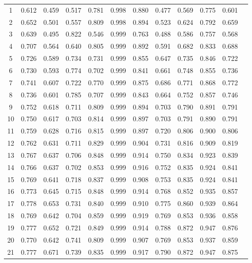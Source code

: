 \begin{longtable}[p]{|c|c|c|c|c|c|c|c|c|c|c|c|}
	
	1 & 0.612 & 0.459 & 0.517 & 0.781 & 0.998 & 0.880 & 0.477 & 0.569 & 0.775 & 0.601 \\
	2 & 0.652 & 0.501 & 0.557 & 0.809 & 0.998 & 0.894 & 0.523 & 0.624 & 0.792 & 0.659 \\
	3 & 0.639 & 0.495 & 0.822 & 0.546 & 0.999 & 0.763 & 0.488 & 0.586 & 0.757 & 0.568 \\
	4 & 0.707 & 0.564 & 0.640 & 0.805 & 0.999 & 0.892 & 0.591 & 0.682 & 0.833 & 0.688 \\
	5 & 0.726 & 0.589 & 0.734 & 0.731 & 0.999 & 0.855 & 0.647 & 0.735 & 0.846 & 0.722 \\
	6 & 0.730 & 0.593 & 0.774 & 0.702 & 0.999 & 0.841 & 0.661 & 0.748 & 0.855 & 0.736 \\
	7 & 0.741 & 0.607 & 0.722 & 0.770 & 0.999 & 0.875 & 0.686 & 0.771 & 0.868 & 0.772 \\
	8 & 0.736 & 0.601 & 0.785 & 0.707 & 0.999 & 0.843 & 0.664 & 0.752 & 0.857 & 0.746 \\
	9 & 0.752 & 0.618 & 0.711 & 0.809 & 0.999 & 0.894 & 0.703 & 0.790 & 0.891 & 0.791 \\
	10 & 0.750 & 0.617 & 0.703 & 0.814 & 0.999 & 0.897 & 0.703 & 0.791 & 0.890 & 0.791 \\
	11 & 0.759 & 0.628 & 0.716 & 0.815 & 0.999 & 0.897 & 0.720 & 0.806 & 0.900 & 0.806 \\
	12 & 0.762 & 0.631 & 0.711 & 0.829 & 0.999 & 0.904 & 0.731 & 0.816 & 0.909 & 0.819 \\
	13 & 0.767 & 0.637 & 0.706 & 0.848 & 0.999 & 0.914 & 0.750 & 0.834 & 0.923 & 0.839 \\
	14 & 0.766 & 0.637 & 0.702 & 0.853 & 0.999 & 0.916 & 0.752 & 0.835 & 0.924 & 0.841 \\
	15 & 0.769 & 0.641 & 0.718 & 0.837 & 0.999 & 0.908 & 0.753 & 0.835 & 0.924 & 0.841 \\
	16 & 0.773 & 0.645 & 0.715 & 0.848 & 0.999 & 0.914 & 0.768 & 0.852 & 0.935 & 0.857 \\
	17 & 0.778 & 0.653 & 0.731 & 0.840 & 0.999 & 0.910 & 0.775 & 0.860 & 0.939 & 0.864 \\
	18 & 0.769 & 0.642 & 0.704 & 0.859 & 0.999 & 0.919 & 0.769 & 0.853 & 0.936 & 0.858 \\
	19 & 0.777 & 0.652 & 0.721 & 0.849 & 0.999 & 0.914 & 0.788 & 0.872 & 0.947 & 0.876 \\
	20 & 0.770 & 0.642 & 0.741 & 0.809 & 0.999 & 0.907 & 0.769 & 0.853 & 0.937 & 0.859 \\
	21 & 0.777 & 0.671 & 0.739 & 0.835 & 0.999 & 0.917 & 0.790 & 0.872 & 0.947 & 0.875 \\

\end{longtable}
